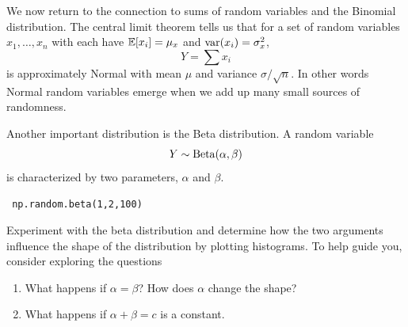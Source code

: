 
We now return to the connection to sums of random variables and the Binomial distribution. The {\dfn central limit theorem} tells us that for a set of random variables $x_1,\dots,x_n$ with each have $\mathbb E[x_i] = \mu_x$ and ${\rm var}(x_i) = \sigma_x^2$,
\begin{equation}
Y = \sum x_i
\end{equation}
is approximately Normal with mean $\mu$ and variance $\sigma/\sqrt{n}$.
In other words Normal random variables emerge when we add up many small sources of randomness.



 \begin{exercise} Another important distribution is the Beta distribution. A random variable 
 \begin{equation}
 Y \sim {\rm Beta}(\alpha,\beta)
 \end{equation}
is characterized by two parameters, $\alpha$ and $\beta$.  
 \begin{Verbatim}
 np.random.beta(1,2,100)
 \end{Verbatim} 
 Experiment with the beta distribution and determine how the two arguments influence the shape of the distribution by plotting histograms. To help guide you, consider exploring the questions 
 \begin{enumerate}
 \item What happens if $\alpha = \beta$? How does $\alpha$ change the shape? 
 \item What happens if $\alpha + \beta =c$ is a constant. 
 \end{enumerate}
\end{exercise}












